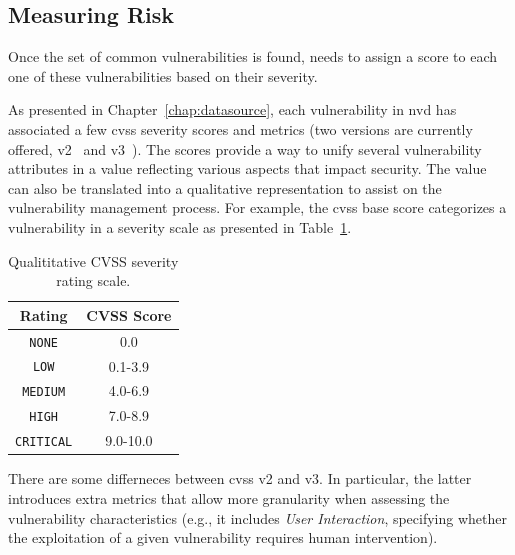 \subsection{Measuring Risk}
\label{sec:measurerisk}


Once the set of common vulnerabilities is found, \system needs to assign a score to each one of these vulnerabilities based on their severity.

As presented in Chapter~\ref{chap:datasource}, each vulnerability in \gls{nvd} has associated a few \gls{cvss} severity scores and metrics (two versions are currently offered, v2~\cite{cvssv2} and v3~\cite{cvssv3}). 
The scores provide a way to unify several vulnerability attributes in a value reflecting various aspects that impact security. 
The value can also be translated into a qualitative representation to assist on the vulnerability management process. 
For example, the \gls{cvss} base score categorizes a vulnerability in a severity scale as presented in Table~\ref{tab:cvss_scale}.


\begin{table}[t]
\begin{center}
{\small
\begin{tabular}{| c | c | }\hline
\textbf{Rating} & \textbf{CVSS Score} \\\hline\hline
\texttt{NONE} & 0.0 \\
\texttt{LOW} & 0.1-3.9 \\
\texttt{MEDIUM} & 4.0-6.9 \\
\texttt{HIGH} & 7.0-8.9 \\
\texttt{CRITICAL} & 9.0-10.0 \\ \hline
\end{tabular}
}
\caption{Qualititative CVSS severity rating scale.}
\label{tab:cvss_scale}
\end{center}
\end{table}

There are some differneces between \gls{cvss} v2 and v3.
In particular, the latter introduces extra metrics that allow more granularity when assessing the vulnerability characteristics (e.g., it includes \emph{User Interaction}, specifying whether the exploitation of a given vulnerability requires human intervention).


